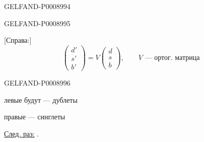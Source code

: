 \begin{GelfandAdjacentEvidence}{GELFAND-P000899}{4}

\end{GelfandAdjacentEvidence}
\begin{GelfandAdjacentEvidence}{GELFAND-P000899}{5}


[Справа:]
\[
\begin{pmatrix}d'\\s'\\b'\end{pmatrix}
=V\begin{pmatrix}d\\s\\b\end{pmatrix},\qquad V\text{ — ортог. матрица}
\]
\end{GelfandAdjacentEvidence}
\begin{GelfandAdjacentEvidence}{GELFAND-P000899}{6}


левые будут — дублеты

правые — синглеты

\underline{\underline{След. раз:}} .
\end{GelfandAdjacentEvidence}



\clearpage
{}
